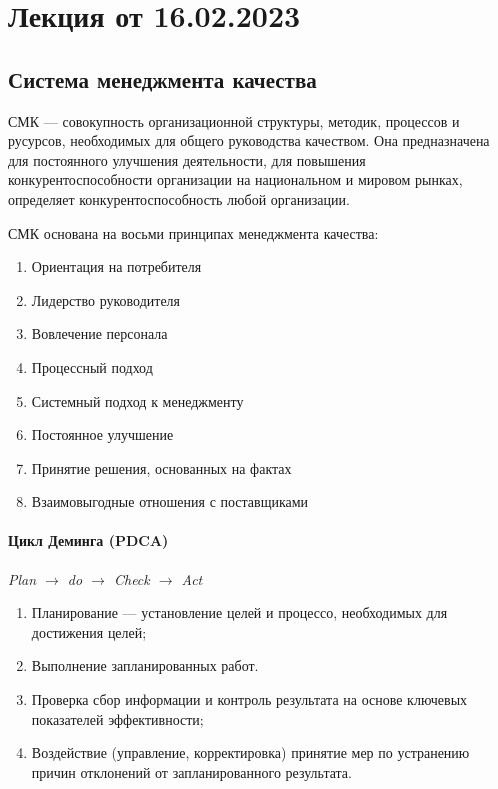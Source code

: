 
\section{Лекция от 16.02.2023}
\subsection{Система менеджмента качества}
СМК --- совокупность организационной структуры, методик, процессов и русурсов,
необходимых для общего руководства качеством. Она предназначена для постоянного
улучшения деятельности, для повышения конкурентоспособности организации на
национальном и мировом рынках, определяет конкурентоспособность любой
организации.

СМК основана на восьми принципах менеджмента качества:
\begin{enumerate}
  \item Ориентация на потребителя
  \item Лидерство руководителя
  \item Вовлечение персонала 
  \item Процессный подход
  \item Системный подход к менеджменту
  \item Постоянное улучшение
  \item Принятие решения, основанных на фактах
  \item Взаимовыгодные отношения с поставщиками
\end{enumerate}

\paragraph{Цикл Деминга (PDCA)}\mbox{}\par
\textit{Plan $\to$ do $\to$ Check $\to$ Act}
\begin{enumerate}
  \item Планирование --- установление целей и процессо, необходимых для
    достижения целей;
  \item Выполнение запланированных работ.
  \item Проверка сбор информации и контроль результата на основе ключевых
    показателей эффективности;
  \item Воздействие (управление, корректировка) принятие мер по устранению
    причин отклонений от запланированного результата.
\end{enumerate}

